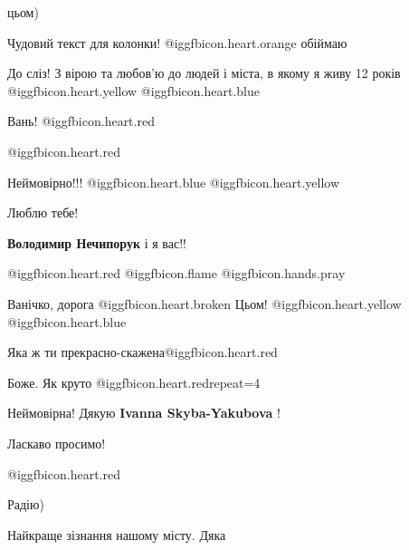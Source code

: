 \begin{itemize}
цьом)

Чудовий текст для колонки!  @igg{fbicon.heart.orange}  обіймаю


До сліз! З вірою та любов'ю до людей і міста, в якому я живу 12 років
@igg{fbicon.heart.yellow}  @igg{fbicon.heart.blue} 

Вань! @igg{fbicon.heart.red}

@igg{fbicon.heart.red}

Неймовірно!!! @igg{fbicon.heart.blue}  @igg{fbicon.heart.yellow} 

Люблю тебе!

\textbf{Володимир Нечипорук} і я вас!!

@igg{fbicon.heart.red} @igg{fbicon.flame}  @igg{fbicon.hands.pray} 


Ванічко, дорога  @igg{fbicon.heart.broken}  Цьом!  @igg{fbicon.heart.yellow}
@igg{fbicon.heart.blue} 

Яка ж ти прекрасно-скажена@igg{fbicon.heart.red}

Боже. Як круто @igg{fbicon.heart.red}{repeat=4}

Неймовірна! Дякую \textbf{Ivanna Skyba-Yakubova} !

Ласкаво просимо!

@igg{fbicon.heart.red}

Радію)

Найкраще зізнання нашому місту. Дяка


\end{itemize} %
